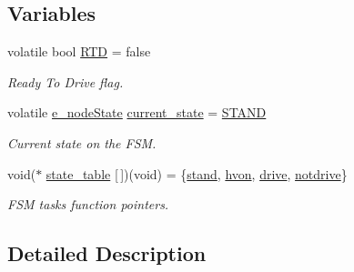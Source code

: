 \subsection*{Variables}
\begin{DoxyCompactItemize}
\item 
\mbox{\label{group__stages__group_ga1fd7369abe3c391498e2e8714bf1b2c7}} 
volatile bool \mbox{\hyperlink{group__stages__group_ga1fd7369abe3c391498e2e8714bf1b2c7}{R\+TD}} = false
\begin{DoxyCompactList}\small\item\em Ready To Drive flag. \end{DoxyCompactList}\item 
\mbox{\label{group__stages__group_ga924e56dabe104382db4ee1a3bb507ed9}} 
volatile \mbox{\hyperlink{group__stages__group_ga29e04432d3efcac24a5ae62572a6e8f2}{e\+\_\+node\+State}} \mbox{\hyperlink{group__stages__group_ga924e56dabe104382db4ee1a3bb507ed9}{current\+\_\+state}} = \mbox{\hyperlink{group__stages__group_gga3136d2815abe9d284f985e0a7ec68646af422fb81d42ecd479de08e64b6533d18}{S\+T\+A\+ND}}
\begin{DoxyCompactList}\small\item\em Current state on the F\+SM. \end{DoxyCompactList}\item 
\mbox{\label{group__stages__group_gac6be9d5998378197fc666c4bcb01f3f2}} 
void($\ast$ \mbox{\hyperlink{group__stages__group_gac6be9d5998378197fc666c4bcb01f3f2}{state\+\_\+table}} \mbox{[}$\,$\mbox{]})(void) = \{\mbox{\hyperlink{group__stages__group_ga506140395cba78bffc95d77985780ca5}{stand}}, \mbox{\hyperlink{group__stages__group_ga6fada8f571df828c8fe6b920e2558c37}{hvon}}, \mbox{\hyperlink{group__stages__group_ga928e32686c7e00c1ecde24c3da3019f7}{drive}}, \mbox{\hyperlink{group__stages__group_ga3ac5d1576c7d3ef76c2dfe724d4849fa}{notdrive}}\}
\begin{DoxyCompactList}\small\item\em F\+SM tasks function pointers. \end{DoxyCompactList}\end{DoxyCompactItemize}


\subsection{Detailed Description}


